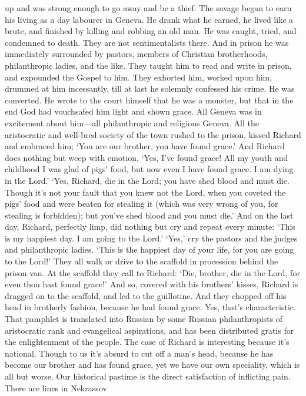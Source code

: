 up and was strong enough to go away and be a thief. The savage began
to earn his living as a day labourer in Geneva. He drank what he
earned, he lived like a brute, and finished by killing and robbing an
old man. He was caught, tried, and condemned to death. They are not
sentimentalists there. And in prison he was immediately surrounded by
pastors, members of Christian brotherhoods, philanthropic ladies, and
the like. They taught him to read and write in prison, and expounded
the Gospel to him. They exhorted him, worked upon him, drummed at him
incessantly, till at last he solemnly confessed his crime. He was
converted. He wrote to the court himself that he was a monster, but
that in the end God had vouchsafed him light and shown grace. All
Geneva was in excitement about him---all philanthropic and religious
Geneva. All the aristocratic and well-bred society of the town rushed
to the prison, kissed Richard and embraced him; `You are our brother,
you have found grace.' And Richard does nothing but weep with emotion,
`Yes, I've found grace! All my youth and childhood I was glad of pigs'
food, but now even I have found grace. I am dying in the Lord.' `Yes,
Richard, die in the Lord; you have shed blood and must die. Though
it's not your fault that you knew not the Lord, when you coveted the
pigs' food and were beaten for stealing it (which was very wrong of
you, for stealing is forbidden); but you've shed blood and you must
die.' And on the last day, Richard, perfectly limp, did nothing but
cry and repeat every minute: `This is my happiest day. I am going to
the Lord.' `Yes,' cry the pastors and the judges and philanthropic
ladies. `This is the happiest day of your life, for  you are
going to the Lord!' They all walk or drive to the scaffold in
procession behind the prison van. At the scaffold they call to
Richard: `Die, brother, die in the Lord, for even thou hast found
grace!' And so, covered with his brothers' kisses, Richard is dragged
on to the scaffold, and led to the guillotine. And they chopped off
his head in brotherly fashion, because he had found grace. Yes, that's
characteristic. That pamphlet is translated into Russian by some
Russian philanthropists of aristocratic rank and evangelical
aspirations, and has been distributed gratis for the enlightenment of
the people. The case of Richard is interesting because it's national.
Though to us it's absurd to cut off a man's head, because he has
become our brother and has found grace, yet we have our own
speciality, which is all but worse. Our historical pastime is the
direct satisfaction of inflicting pain. There are lines in Nekrassov
